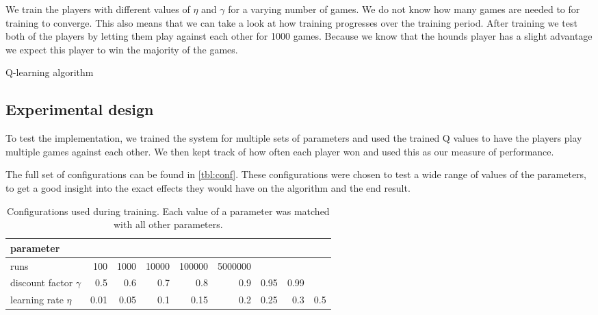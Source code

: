 We train the players with different values of $\eta$ and $\gamma$ for a varying
number of games. We do not know how many games are needed to for training to
converge. This also means that we can take a look at how training progresses
over the training period. After training we test both of the players by letting
them play against each other for 1000 games. Because we know that the hounds
player has a slight advantage we expect this player to win the majority of the
games.

\begin{algorithm}
\caption{Q-learning algorithm\cite{alpaydin}}
\label{alg:Qlearning}
\begin{algorithmic}[1]
	\Repeat
\EndFor
\end{algorithmic}
\end{algorithm}

\subsection{Experimental design}
To test the implementation, we trained the system for multiple sets of
parameters and used the trained Q values to have the players play multiple
games against each other. We then kept track of how often each player won
and used this as our measure of performance. 

The full set of configurations can be found in \autoref{tbl:conf}. These
configurations were chosen to test a wide range of values of the
parameters, to get a good insight into the exact effects they would have on
the algorithm and the end result. 

\begin{table}
    \centering
    \caption{Configurations used during training. Each value of a parameter
        was matched with all other parameters.}
    \label{tbl:conf}
    \begin{tabular}{l|rrrrrrrr}
        \hline
        parameter & \\
        \hline
        runs & 100 & 1000 & 10000 & 100000 & 5000000 \\
        discount factor $\gamma$ & 0.5 & 0.6 & 0.7 & 0.8 & 0.9 & 0.95 &
        0.99 \\
        learning rate $\eta$ & 0.01 & 0.05 & 0.1 & 0.15 & 0.2 & 0.25 & 0.3
        & 0.5 \\
        \hline
    \end{tabular}
\end{table}
